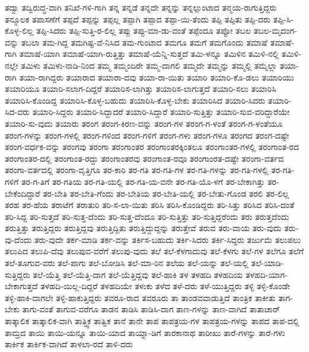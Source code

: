 {ತದ್ವಾ
ತದ್ವಿರುದ್ಧ-ವಾಗಿ
ತನಿಖೆ-ಗಳಿ-ಗಾಗಿ
ತನ್ನ
ತನ್ನಡೆ
ತನ್ನದೇ
ತನ್ನನ್ನು
ತನ್ನಲ್ಲುಂಟಾದ
ತನ್ಮಯ-ರಾಗುತ್ತಿದ್ದರು
ತನ್ಮೂಲಕ
ತಪಾಸಣೆಗೆ
ತಪ್ಪದೆ
ತಪ್ಪನ್ನು
ತಪ್ಪಲ್ಲ
ತಪ್ಪಾಗಿ
ತಪ್ಪಾದ
ತಪ್ಪಾ-ಯಿ-ತೆಂದು
ತಪ್ಪಿ
ತಪ್ಪಿತು
ತಪ್ಪಿ-ದರು
ತಪ್ಪಿ-ಸಿ-ಕೊಳ್ಳ-ಲಿಲ್ಲ
ತಪ್ಪಿ-ಸಿದರು
ತಪ್ಪಿ-ಸುತ್ತಿ-ರ-ಲಿಲ್ಲ
ತಪ್ಪು
ತಪ್ಪು-ಮಾ-ಡು-ವಂತೆ
ತಪ್ಪೆಂದೂ
ತಪ್ಪೋ
ತಬಲ
ತಬಲ-ಮೃದಂಗ-ವನ್ನು
ತಬಲಾ
ತಮ-ಗಿದ್ದ
ತಮಗಿಷ್ಟ-ವೆ-ನಿಸಿದ
ತಮ-ಗುಂಟಾದ
ತಮಗೂ
ತಮಗೆ
ತಮಗೊಂದು
ತಮಾಷೆ
ತಮಾಷೆ-ಗಾಗಿ
ತಮಾಷೆ-ಯಾಗಿ
ತಮಾಷೆ-ಯಾಗಿ-ರುತ್ತಿತ್ತು
ತಮಾಷೆ-ಯೆನ್ನಿ-ಸುತ್ತದೆ
ತಮಿ-ಳನ್ನೂ
ತಮಿಳಿನ
ತಮಿಳಿ-ನಲ್ಲಿ
ತಮಿಳಿ-ನಲ್ಲೇ
ತಮಿಳು
ತಮಿಳು-ನಾಡಿ-ನಿಂದ
ತಮ್ಮ
ತಮ್ಮಂದಿರೇ
ತಮ್ಮ-ದಾಗಲಿ
ತಮ್ಮದೇ
ತಮ್ಮನ್ನು
ತಮ್ಮಲ್ಲಿ
ತಮ್ಮೆಲ್ಲಾ
ತಯಾ-ರಾಗಿ
ತಯಾ-ರಾಗಿದ್ದರು
ತಯಾರಾದ
ತಯಾರಾ-ದವು
ತಯಾ-ರಾ-ಯಿತು
ತಯಾರಿ
ತಯಾರಿ-ಕೊ-ಡಲು
ತಯಾರಿಯು
ತಯಾರಿಯೂ
ತಯಾರಿ-ಸಲಾಗ-ದಿದ್ದರೆ
ತಯಾರಿಸ-ಲಾಗಿತ್ತು
ತಯಾರಿಸ-ಲಾಗುತ್ತದೆ
ತಯಾರಿ-ಸಲು
ತಯಾರಿಸಿ
ತಯಾರಿಸಿ-ಕೊಂಡಿದ್ದ
ತಯಾರಿಸಿ-ಕೊಳ್ಳ-ಬಹುದು
ತಯಾರಿಸಿ-ಕೊಳ್ಳ-ಬೇಕು
ತಯಾರಿಸಿದ
ತಯಾರಿ-ಸಿದರು
ತಯಾರಿ-ಸಿದ-ವರು
ತಯಾರಿ-ಸಿದ್ದರು
ತಯಾರಿ-ಸಿದ್ದಾದರೆ
ತಯಾರಿ-ಸಿದ್ದಾರೆ
ತಯಾರಿ-ಸುತ್ತಿತ್ತು
ತಯಾರಿ-ಸುವ-ವರಿದ್ದಾರೆಯೇ
ತಯಾರಿ-ಸು-ವುದು
ತಯಾರು
ತರಂಗ
ತರಂಗ-ಕಿರಣ-ವನ್ನು
ತರಂಗ-ಗಳ
ತರಂಗ-ಗ-ಳಂತೆ
ತರಂಗ-ಗ-ಳಂತೆಯೂ
ತರಂಗ-ಗಳನ್ನು
ತರಂಗ-ಗಳಲ್ಲಿ
ತರಂಗ-ಗಳಿಂದ
ತರಂಗ-ಗಳಿಗೆ
ತರಂಗ-ಗಳು
ತರಂಗ-ಗಳೂ
ತರಂಗದ
ತರಂಗ-ದಷ್ಟೇ
ತರಂಗ-ವರ್ಧಕ-ವನ್ನು
ತರಂಗವು
ತರಂಗಾ
ತರಂಗಾಂತರ
ತರಂಗಾಂತರಕ್ಕಿಂತಲೂ
ತರಂಗಾಂತರ-ಗಳಲ್ಲಿ
ತರಂಗಾಂತ-ರದ
ತರಂಗಾಂತರ-ದಲ್ಲಿ
ತರಂಗಾಂತ-ರದ್ದು
ತರಂಗಾಂತರವು
ತರಂಗಾಂತ-ರವೂ
ತರಂಗಾಂರತ-ದಷ್ಟೇ
ತರಂಗಾ-ವರ್ತದ
ತರಂಗಾ-ವರ್ತದಲ್ಲಿ
ತರಂಗಾ-ವೃತ್ತಿಗೂ
ತರ-ಕಾರಿ
ತರ-ಗತಿ
ತರ-ಗತಿ-ಗಳ
ತರ-ಗತಿ-ಗಳನ್ನು
ತರ-ಗತಿ-ಗಳಲ್ಲಿ
ತರ-ಗತಿ-ಗಳಿಗೆ
ತರ-ಗ-ತಿಗೆ
ತರ-ಗತಿಯ
ತರ-ಗತಿ-ಯಲ್ಲಿ
ತರ-ಗತಿ-ಯ-ವನೇ
ತರ-ಗತಿ-ಯೊ-ಳಗೆ
ತರ-ಬೇಕಾಗಿತ್ತು
ತರ-ಬೇಕೆಂದಿದ್ದಾರೆ
ತರ-ಬೇತಿ
ತರ-ಬೇತಿ-ಗೆಂದು
ತರ-ಬೇತಿಯ
ತರ-ಬೇತಿ-ಯಲ್ಲಿ
ತರ-ಬೇತು-ಗೊಂಡ
ತರಲಿ
ತರ-ಲಿಲ್ಲ
ತರಹ
ತರ-ಹೆಯ
ತರಾಟೆಗೆ
ತರಾತುರಿ
ತರಿ-ಸ-ಲಾ-ಯಿತು
ತರಿಸಿ
ತರಿಸಿ-ಕೊಂಡಿದ್ದರು
ತರಿ-ಸಿತ್ತು
ತರಿಸಿದ
ತರಿಸಿ-ದಂತೆ
ತರಿ-ಸಿದ್ದ
ತರಿ-ಸುತ್ತದೆ
ತರಿ-ಸುತ್ತ-ದೆಂದು
ತರಿ-ಸುತ್ತ-ದೆಂದೂ
ತರಿ-ಸುತ್ತಿತ್ತು
ತರಿ-ಸುತ್ತಿದ್ದರೆಂದು
ತರು
ತರುತ್ತದೆಂದು
ತರುತ್ತಿತ್ತು
ತರುತ್ತಿದ್ದರು
ತರುತ್ತಿದ್ದವು
ತರುತ್ತಿದ್ದಿತು
ತರುತ್ತಿದ್ದುದ್ದನ್ನು
ತರುತ್ತೇವೆ
ತರುವ
ತರು-ವಾಯ
ತರು-ವುದು
ತರು-ವು-ದೆಂದು
ತರು-ವುದೇ
ತರ್ಕ-ಮಾಡಿ
ತರ್ಕ-ವನ್ನು
ತರ್ಕಿಸ-ಬಹುದು
ತರ್ಕಿ-ಸಿದರು
ತರ್ಕಿ-ಸಿದ್ದರು
ತರ್ಜುಮೆ
ತಲುಪಲು
ತಲುಪಿದ
ತಲುಪಿ-ದೆವು
ತಲುಪುವ-ವರೆಗೆ
ತಲುಪು-ವುದು
ತಲೆ
ತಲೆ-ಕೆಳಗಾದುವು
ತಲೆ-ಕೆಳಗು
ತಲೆ-ಗಳ
ತಲೆಗೂ
ತಲೆಗೆ
ತಲೆ-ತೂಗುವ-ವರು
ತಲೆ-ಪಾಗು
ತಲೆ-ಬೋಡಿಸಿ
ತಲೆ-ಮಾ-ರಿನ
ತಲೆಯ
ತಲೆ-ಯನ್ನು
ತಲೆ-ಯಲ್ಲಿ
ತಲೆ-ಯಾಡಿ-ಸುತ್ತಿದ್ದರು
ತಲೆ-ಯೆತ್ತಿ
ತಲೆ-ಯೆತ್ತಿ-ದಾಗ
ತಲೆ-ಯೆತ್ತಿದ್ದವು
ತಲೆ-ಹಾಕಿ
ತಳ
ತಳಹದಿ
ತಳಹದಿಯ
ತಳಹದಿ-ಯಾಗ-ಬೇಕಾಗುತ್ತದೆ
ತಳಹದಿ-ಯಿಲ್ಲ-ದಿದ್ದರೆ
ತಳಹದಿಯೇ
ತಳುಕು
ತಳೆದ
ತಳೆ-ದರು
ತಳೆ-ಯುತ್ತಿದ್ದರು
ತಳ್ಳಿ
ತಳ್ಳಿ-ಕೊಂಡೇ
ತಳ್ಳಿ-ಹಾಕಿ-ದಾಗಲೇ
ತಳ್ಳಿ-ಹಾಕುತ್ತಿದ್ದರು
ತವರೂ-ರಾದ
ತವರೂರು
ತಾ
ತಾಂಡವವಾಡುತ್ತಿದೆ
ತಾಂತ್ರಿಕ
ತಾಕೀತು
ತಾಗ-ಬೇಕು
ತಾಗು-ವಂತೆ
ತಾಗುವ-ವರೆಗೂ
ತಾಡನ
ತಾಡಿಸಿ
ತಾಡಿಸಿ-ದಾಗ
ತಾಣ-ಗಳನ್ನು
ತಾಣ-ವಾಗಿದೆ
ತಾತಾಚಾರ್
ತಾತ್ಕಾಲಿಕ
ತಾತ್ಕಾಲಿಕ-ವಾಗಿ
ತಾತ್ತ್ವಿಕ
ತಾತ್ವಿಕ
ತಾನೆ
ತಾನೇ
ತಾಪ
ತಾಪತ್ರಯ-ಗಳ
ತಾಪತ್ರಯ-ಗಳನ್ನು
ತಾಪದ
ತಾಪ-ದಲ್ಲಿ
ತಾಮ್ರದ
ತಾಯಿ
ತಾಯಿ-ಯನ್ನೂ
ತಾಯಿ-ಯಾದ
ತಾಯ್ನಾ-ಡಿಗೆ
ತಾರಕಾನಾಥ
ತಾರೀಖು
ತಾರೆ-ಗಳನ್ನು
ತಾರೆ-ಗಳು
ತಾರ್ಕಿಕ
ತಾರ್ಕಿಕ-ವಾಗಿದೆ
ತಾಳಲಾ-ರದೆ
ತಾಳಿ-ದರು
}
